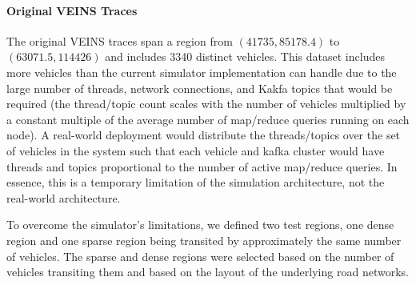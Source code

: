 \documentclass{thesis}
\begin{document}
    \paragraph{Original VEINS Traces}
        The original VEINS traces span a region from $(41735, 85178.4)$ to $(63071.5, 114426)$ and includes 3340 distinct
        vehicles. This dataset includes more vehicles than the current simulator implementation can handle due to the large
        number of threads, network connections, and Kakfa topics that would be required (the thread/topic count scales with the
        number of vehicles multiplied by a constant multiple of the average number of map/reduce queries running on each node).
        A real-world deployment would distribute the threads/topics over the set of vehicles in the system such that each
        vehicle and kafka cluster would have threads and topics proportional to the number of active map/reduce queries.
        In essence, this is a temporary limitation of the simulation architecture, not the real-world architecture.

        To overcome the simulator's limitations, we defined two test regions, one dense region and one sparse region
        being transited by approximately the same number of vehicles. The sparse and dense regions were selected based
        on the number of vehicles transiting them and based on the layout of the underlying road networks.
\end{document}
